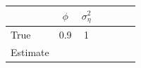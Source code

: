 \begin{tabular}{lcccccc}
\toprule
& $\phi$ & $\sigma_\eta^2$ \\
\midrule
True & 0.9 & 1 \\
Estimate &  &  \\
\bottomrule
\end{tabular}
